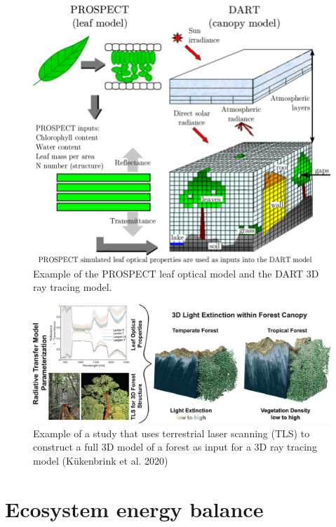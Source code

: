 \documentclass[
  oneside]{book}
\begin{document}
\begin{figure}

{\centering \includegraphics[width=0.8\linewidth]{figures/chap3/f327_DART} 

}

\caption{Example of the PROSPECT leaf optical model and the DART 3D ray tracing model.}\label{fig:f327}
\end{figure}

\begin{figure}

{\centering \includegraphics[width=0.8\linewidth]{figures/chap3/f328_TLS_RT} 

}

\caption{Example of a study that uses terrestrial laser scanning (TLS) to construct a full 3D model of a forest as input for a 3D ray tracing model (Kükenbrink et al. 2020) }\label{fig:f328}
\end{figure}

\hypertarget{ecosystem-energy-balance}{%
\section{Ecosystem energy balance}\label{ecosystem-energy-balance}}
\end{document}
